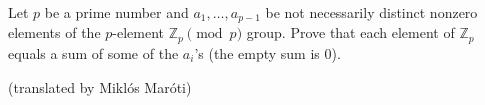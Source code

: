 Let $p$ be a prime number and $a_1, \ldots, a_{p-1}$ be not necessarily distinct nonzero elements of the $p$-element $\mathbb Z_p \pmod{p}$ group. Prove that each element of $\mathbb Z_p$ equals a sum of some of the $a_i$'s (the empty sum is $0$).

(translated by Miklós Maróti)
